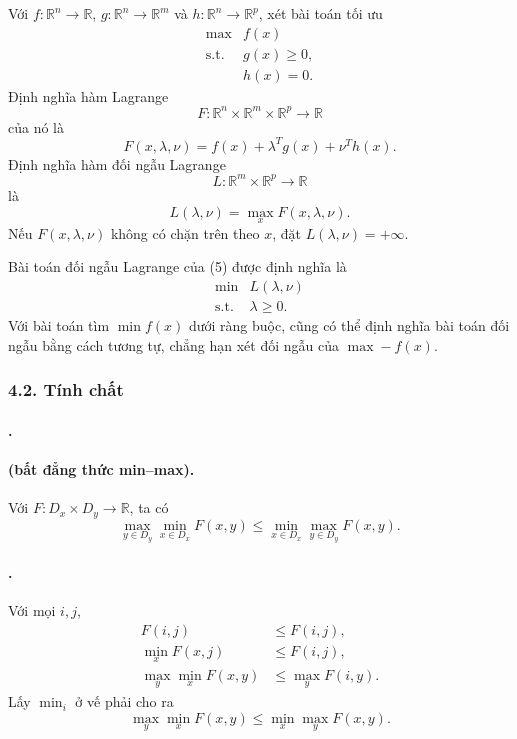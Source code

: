 \documentclass[11pt]{article}
\begin{document}
Với \(f:\mathbb R^n\to\mathbb R\), \(g:\mathbb R^n\to\mathbb R^m\) và
\(h:\mathbb R^n\to\mathbb R^p\), xét bài toán tối ưu
\[
\begin{array}{ll}
  \max & f(x)\\
  \text{s.t.} & g(x)\ge 0,\\
              & h(x)=0.
\end{array}
\tag{5}
\]
Định nghĩa hàm Lagrange
\[
  F:\mathbb R^n\times\mathbb R^m\times\mathbb R^p\to\mathbb R
\]
của nó là
\[
  F(x,\lambda,\nu)=f(x)+\lambda^Tg(x)+\nu^Th(x).
\]
Định nghĩa hàm đối ngẫu Lagrange
\[
  L:\mathbb R^m\times\mathbb R^p\to\mathbb R
\]
là
\[
  L(\lambda,\nu)=\max_x F(x,\lambda,\nu).
\]
Nếu \(F(x,\lambda,\nu)\) không có chặn trên theo \(x\), đặt
\(L(\lambda,\nu)=+\infty\).

Bài toán đối ngẫu Lagrange của (5) được định nghĩa là
\[
\begin{array}{ll}
  \min & L(\lambda,\nu)\\
  \text{s.t.} & \lambda\ge 0.
\end{array}
\tag{6}
\]
Với bài toán tìm \(\min f(x)\) dưới ràng buộc, cũng có thể định nghĩa bài toán
đối ngẫu bằng cách tương tự, chẳng hạn xét đối ngẫu của \(\max -f(x)\).

\subsubsection*{4.2. Tính chất}

\paragraph{.}
\paragraph{ (bất đẳng thức min--max).}
Với \(F:D_x\times D_y\to\mathbb R\), ta có
\[
  \max_{y\in D_y}\min_{x\in D_x}F(x,y)
  \le
  \min_{x\in D_x}\max_{y\in D_y}F(x,y).
\]

\paragraph{.}
Với mọi \(i,j\),
\[
\begin{aligned}
  F(i,j)&\le F(i,j),\\
  \min_x F(x,j)&\le F(i,j),\\
  \max_y\min_x F(x,y)&\le \max_y F(i,y).
\end{aligned}
\]
Lấy \(\min_i\) ở vế phải cho ra
\[
  \max_y\min_x F(x,y)\le \min_x\max_y F(x,y).
\]
\end{document}
